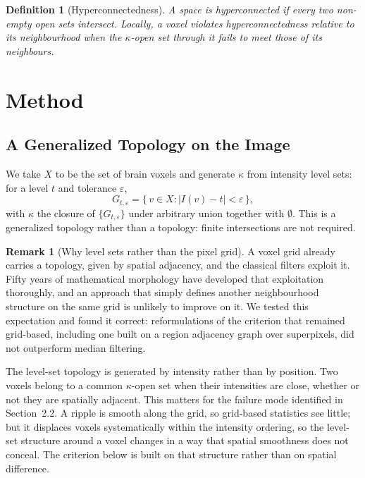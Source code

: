 \documentclass[12pt]{article}
\newtheorem{definition}{Definition}[section]
\theoremstyle{definition}
\newtheorem{remark}{Remark}[section]
\theoremstyle{plain}
\begin{document}
\begin{definition}[Hyperconnectedness]
A space is hyperconnected if every two non-empty open sets intersect. Locally, a
voxel violates hyperconnectedness relative to its neighbourhood when the
$\kappa$-open set through it fails to meet those of its neighbours.
\end{definition}

\section{Method}

\subsection{A Generalized Topology on the Image}

We take $X$ to be the set of brain voxels and generate $\kappa$ from intensity level
sets: for a level $t$ and tolerance $\varepsilon$,
\begin{equation}
    G_{t,\varepsilon} = \{\, v \in X : |I(v) - t| < \varepsilon \,\},
\end{equation}
with $\kappa$ the closure of $\{G_{t,\varepsilon}\}$ under arbitrary union together
with $\emptyset$. This is a generalized topology rather than a topology: finite
intersections are not required.

\begin{remark}[Why level sets rather than the pixel grid]
A voxel grid already carries a topology, given by spatial adjacency, and the
classical filters exploit it. Fifty years of mathematical morphology have developed
that exploitation thoroughly, and an approach that simply defines another
neighbourhood structure on the same grid is unlikely to improve on it. We tested
this expectation and found it correct: reformulations of the criterion that remained
grid-based, including one built on a region adjacency graph over superpixels, did
not outperform median filtering.

The level-set topology is generated by intensity rather than by position. Two voxels
belong to a common $\kappa$-open set when their intensities are close, whether or
not they are spatially adjacent. This matters for the failure mode identified in
Section~2.2. A ripple is smooth along the grid, so grid-based statistics see little;
but it displaces voxels systematically within the intensity ordering, so the
level-set structure around a voxel changes in a way that spatial smoothness does not
conceal. The criterion below is built on that structure rather than on spatial
difference.
\end{remark}
\end{document}
